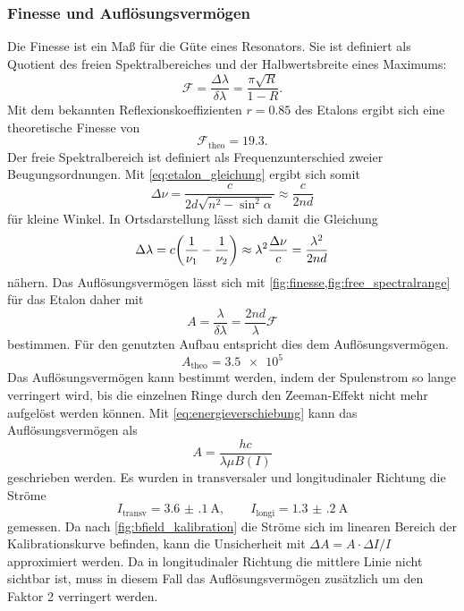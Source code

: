 \subsubsection{Finesse und Auflösungsvermögen}
Die Finesse ist ein Maß für die Güte eines Resonators. Sie ist definiert als Quotient 
des freien Spektralbereiches und der Halbwertsbreite eines Maximums:
\begin{equation}
    \mathcal F = \frac{\Delta\lambda}{\delta \lambda} = \frac{\pi\sqrt R}{1-R}.
    \label{fig:finesse}
\end{equation}
Mit dem bekannten Reflexionskoeffizienten $r=0.85$ des Etalons ergibt sich eine theoretische Finesse 
von 
\[\mathcal F_\mathrm{theo} = \num{19.3}.\]
Der freie Spektralbereich ist definiert als Frequenzunterschied zweier Beugungsordnungen. 
Mit \cref{eq:etalon_gleichung} ergibt sich somit 
\begin{equation*}
    \Delta\nu = \frac{c}{2d\sqrt{n^2-\sin^2\alpha}} \approx \frac{c}{2nd}
\end{equation*}
für kleine Winkel. In Ortsdarstellung lässt sich damit die Gleichung 
\begin{equation}
    \Delta\lambda = c\qty(\frac{1}{\nu_1} - \frac{1}{\nu_2})\approx \lambda^2\frac{\Delta\nu}{c}
        =  \frac{\lambda^2}{2nd}
    \label{fig:free_spectralrange}
\end{equation}
nähern. Das Auflösungsvermögen lässt sich mit \cref{fig:finesse,fig:free_spectralrange} 
für das Etalon daher mit
\begin{equation}
    A = \frac{\lambda}{\delta\lambda} = \frac{2nd}{\lambda}\mathcal F
    \label{eq:finesse}
\end{equation}
bestimmen. Für den genutzten Aufbau entspricht dies dem Auflösungsvermögen.
\[A_\mathrm{theo} = \num{3.5e5}\]
Das Auflösungsvermögen kann bestimmt werden, indem der Spulenstrom so lange 
verringert wird, bis die einzelnen Ringe durch den Zeeman-Effekt nicht mehr aufgelöst werden 
können. Mit \cref{eq:energieverschiebung} kann das Auflösungsvermögen als 
\[A = \frac{hc}{\lambda\mu B(I)}\]
geschrieben werden. Es wurden in transversaler und longitudinaler Richtung 
die Ströme 
\[I_\mathrm{transv} = \SI{3.6(1)}{\ampere},
\qquad I_\mathrm{longi} = \SI{1.3(2)}{\ampere}\]
gemessen. Da nach \cref{fig:bfield_kalibration} die Ströme sich im linearen Bereich 
der Kalibrationskurve befinden, kann die Unsicherheit mit 
$\Delta A = A\cdot\Delta I/I$
approximiert werden. Da in longitudinaler Richtung die mittlere Linie nicht sichtbar ist, muss 
in diesem Fall das Auflösungsvermögen zusätzlich um den Faktor 2 verringert werden.
